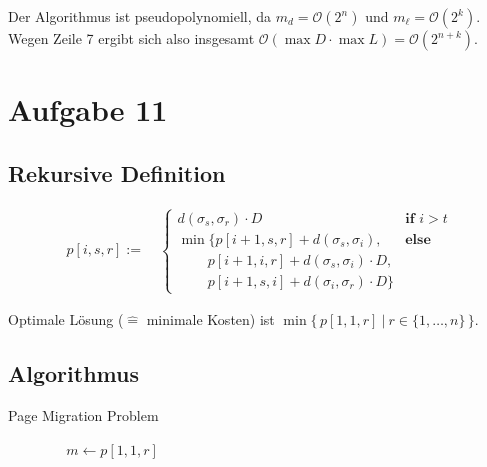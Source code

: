 Der Algorithmus ist pseudopolynomiell, da $m_d = \mathcal{O}(2^n)$ und $m_\ell = \mathcal{O}(2^k)$. \\
Wegen Zeile 7 ergibt sich also insgesamt $\mathcal{O}(\max D \cdot \max L) = \mathcal{O}(2^{n + k})$.

\section*{Aufgabe 11}
\label{sec:Aufgabe 11}

\setcounter{subsection}{0}

\subsection{Rekursive Definition}
\label{sub:Rekursive Definition}

\begin{align*}
	p[i, s, r] := &\ \begin{cases}
		d(\sigma_s, \sigma_r) \cdot D & \textbf{if } i > t \\
		\min \{ p[i + 1, s, r] + d(\sigma_s, \sigma_i), & \textbf{else} \\
		\qquad\, p[i + 1, i, r] + d(\sigma_s, \sigma_i) \cdot D, \\
		\qquad\, p[i + 1, s, i] + d(\sigma_i, \sigma_r) \cdot D \}
	\end{cases}
\end{align*}

Optimale Lösung ($\hat{=}$ minimale Kosten) ist $\min \{ \, p[1, 1, r]\ |\ r \in \{ 1, \dots, n \} \, \}$.

\subsection{Algorithmus}
\label{sub:Algorithmus}

\begin{algorithm}
	\caption{Page Migration Problem}
	\begin{algorithmic}[1]
			 
				 
					 
				\EndFor\
			\EndFor\
			\Statex\
			 
				 
					 
						 
					\EndFor\
				\EndFor\
			\EndFor\
			\Statex\
			\For{$r \gets 1 \ato n$} \Comment{$\mathcal{O}(n)$}
				\If{$p[1, 1, r] < m$}
					$m \gets p[1, 1, r]$
				\EndIf\
			\EndFor\
			\Statex\
		\EndFunction{}
	\end{algorithmic}
\end{algorithm}

